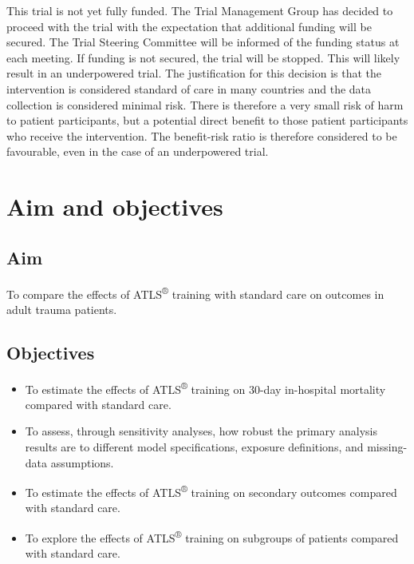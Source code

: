 \documentclass[
]{scrartcl}
\providecommand{\tightlist}{%
  \setlength{\itemsep}{0pt}\setlength{\parskip}{0pt}}\usepackage{longtable,booktabs,array}
\begin{document}
This trial is not yet fully funded. The Trial Management Group has
decided to proceed with the trial with the expectation that additional
funding will be secured. The Trial Steering Committee will be informed
of the funding status at each meeting. If funding is not secured, the
trial will be stopped. This will likely result in an underpowered trial.
The justification for this decision is that the intervention is
considered standard of care in many countries and the data collection is
considered minimal risk. There is therefore a very small risk of harm to
patient participants, but a potential direct benefit to those patient
participants who receive the intervention. The benefit-risk ratio is
therefore considered to be favourable, even in the case of an
underpowered trial.

\newpage{}

\section{Aim and objectives}\label{sec-aim-and-objectives}

\subsection{Aim}\label{sec-aim}

To compare the effects of ATLS\textsuperscript{®} training with standard
care on outcomes in adult trauma patients.

\subsection{Objectives}\label{sec-objectives}

\begin{itemize}
\tightlist
\item
  To estimate the effects of ATLS\textsuperscript{®} training on 30-day
  in-hospital mortality compared with standard care.
\item
  To assess, through sensitivity analyses, how robust the primary
  analysis results are to different model specifications, exposure
  definitions, and missing-data assumptions.
\item
  To estimate the effects of ATLS\textsuperscript{®} training on
  secondary outcomes compared with standard care.
\item
  To explore the effects of ATLS\textsuperscript{®} training on
  subgroups of patients compared with standard care.
\end{itemize}
\end{document}
